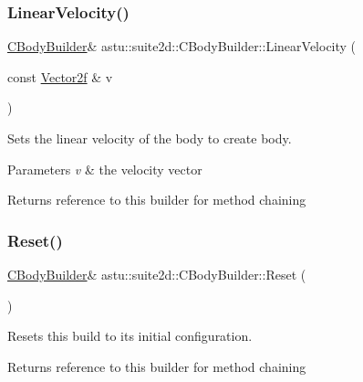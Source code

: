 \subsubsection{\texorpdfstring{Linear\+Velocity()}{LinearVelocity()}\hspace{0.1cm}{\footnotesize\ttfamily [2/2]}}
{\footnotesize\ttfamily \hyperlink{classastu_1_1suite2d_1_1CBodyBuilder}{C\+Body\+Builder}\& astu\+::suite2d\+::\+C\+Body\+Builder\+::\+Linear\+Velocity (\begin{DoxyParamCaption}\item[{const \hyperlink{classastu_1_1Vector2}{Vector2f} \&}]{v }\end{DoxyParamCaption})\hspace{0.3cm}{\ttfamily [inline]}}

Sets the linear velocity of the body to create body.


\begin{DoxyParams}{Parameters}
{\em v} & the velocity vector \\
\hline
\end{DoxyParams}
\begin{DoxyReturn}{Returns}
reference to this builder for method chaining 
\end{DoxyReturn}
\mbox{\label{classastu_1_1suite2d_1_1CBodyBuilder_aa1eba70e75a9b7ac0c915e9b2f2cdf8d}} 
\subsubsection{\texorpdfstring{Reset()}{Reset()}}
{\footnotesize\ttfamily \hyperlink{classastu_1_1suite2d_1_1CBodyBuilder}{C\+Body\+Builder}\& astu\+::suite2d\+::\+C\+Body\+Builder\+::\+Reset (\begin{DoxyParamCaption}{ }\end{DoxyParamCaption})\hspace{0.3cm}{\ttfamily [inline]}}

Resets this build to its initial configuration.

\begin{DoxyReturn}{Returns}
reference to this builder for method chaining 
\end{DoxyReturn}
\mbox{\label{classastu_1_1suite2d_1_1CBodyBuilder_a42f2d0af41647c1617cb948d72d2fe0f}} 
